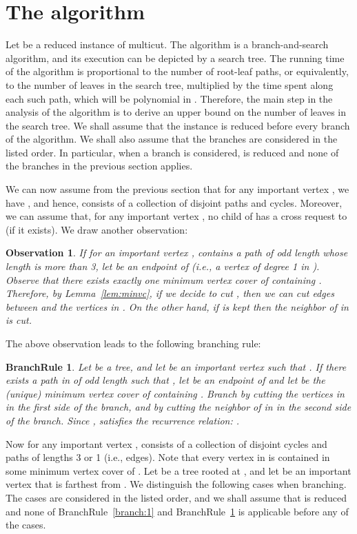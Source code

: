 \documentclass[11pt]{article}
\newtheorem{observation}[theorem]{Observation}
\newtheorem{branchrule}[theorem]{BranchRule}
\begin{document}
\section{The algorithm}
\label{sec:algo}
Let  be a reduced instance of {\sc multicut}. The algorithm is a branch-and-search algorithm, and
its execution can be depicted by a search tree. The running time
of the algorithm is proportional to the number of root-leaf paths,
or equivalently, to the number of leaves in the search tree,
multiplied by the time spent along each such path, which will be polynomial in . Therefore, the
main step in the analysis of the algorithm is to derive an upper
bound on the number of leaves  in the search tree. We shall assume that the instance  is reduced before every branch of the algorithm. We shall also assume that the branches are considered in the listed order. In particular, when a branch is considered,  is reduced and none of the branches in the previous section applies.


We can now assume from the previous section that for any important vertex , we have , and hence,  consists of a collection of disjoint paths and cycles.
Moreover, we can assume that, for any important vertex , no child of  has a cross request to  (if it exists). We draw another observation:

\begin{observation}
\label{obs:oddpath}
If for an important vertex ,  contains a path  of odd length whose length is more than 3, let  be an endpoint of  (i.e., a vertex of degree 1 in ). Observe that there exists exactly one minimum vertex cover  of  containing . Therefore, by Lemma~\ref{lem:minvc}, if we decide to cut , then we can cut  edges between  and the vertices in . On the other hand, if  is kept then the neighbor of  in  is cut.
\end{observation}

The above observation leads to the following branching rule:


\begin{branchrule}\label{branch:3}
Let  be a tree, and let  be an important vertex such that . If there exists a path  in  of odd length such that , let  be an endpoint of  and let  be the (unique) minimum vertex cover of  containing . Branch by cutting the vertices in  in the first side of the branch, and by cutting the neighbor of  in  in the second side of the branch. Since ,  satisfies the recurrence relation: .
\end{branchrule}


Now for any important vertex ,  consists of a collection of disjoint cycles and paths of lengths 3 or 1 (i.e., edges). Note that every vertex in  is contained in some minimum vertex cover of . Let  be a tree rooted at , and let  be an important vertex that is farthest from . We distinguish the following cases when branching. The cases are considered in the listed order, and we shall assume that  is reduced and none of BranchRule~\ref{branch:1} and BranchRule~\ref{branch:3} is applicable before any of the cases.
\end{document}
